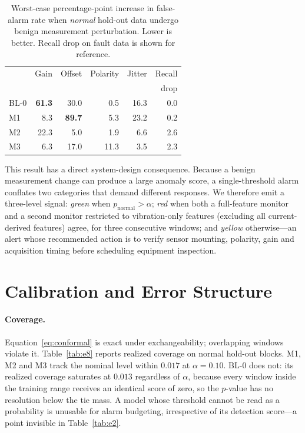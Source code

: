 \documentclass{article}
\begin{document}
\begin{table}[t]
\caption{Worst-case percentage-point increase in false-alarm rate when
\emph{normal} hold-out data undergo benign measurement perturbation. Lower is
better. Recall drop on fault data is shown for reference.}
\label{tab:e5}
\vskip 0.08in
\centering
\small
\setlength{\tabcolsep}{4pt}
\begin{tabular}{lrrrrr}
\toprule
 & Gain & Offset & Polarity & Jitter & Recall \\
 &  &  &  &  & drop \\
\midrule
BL-0 & \textbf{61.3} & 30.0 & 0.5 & 16.3 & 0.0 \\
M1   & 8.3 & \textbf{89.7} & 5.3 & 23.2 & 0.2 \\
M2   & 22.3 & 5.0 & 1.9 & 6.6 & 2.6 \\
M3   & 6.3 & 17.0 & 11.3 & 3.5 & 2.3 \\
\bottomrule
\end{tabular}
\end{table}

This result has a direct system-design consequence. Because a benign
measurement change can produce a large anomaly score, a single-threshold
alarm conflates two categories that demand different responses. We therefore
emit a three-level signal: \emph{green} when $p_{\text{normal}} > \alpha$;
\emph{red} when both a full-feature monitor and a second monitor restricted to
vibration-only features (excluding all current-derived features) agree, for
three consecutive windows; and \emph{yellow} otherwise---an alert whose
recommended action is to verify sensor mounting, polarity, gain and
acquisition timing before scheduling equipment inspection.

\section{Calibration and Error Structure}
\label{sec:calib}

\paragraph{Coverage.} Equation~\ref{eq:conformal} is exact under
exchangeability; overlapping windows violate it. Table~\ref{tab:e8} reports
realized coverage on normal hold-out blocks. M1, M2 and M3 track the nominal
level within $0.017$ at $\alpha = 0.10$. BL-0 does not: its realized coverage
saturates at $0.013$ regardless of $\alpha$, because every window inside the
training range receives an identical score of zero, so the $p$-value has no
resolution below the tie mass. A model whose threshold cannot be read as a
probability is unusable for alarm budgeting, irrespective of its detection
score---a point invisible in Table~\ref{tab:e2}.
\end{document}

